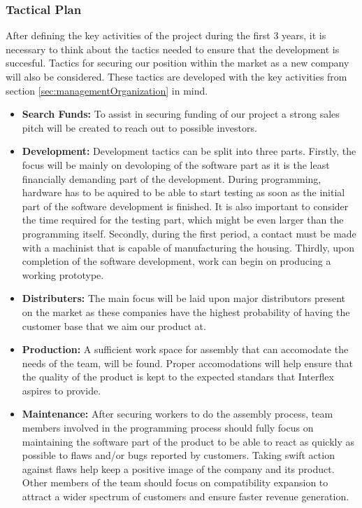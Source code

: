 \subsubsection{Tactical Plan}
After defining the key activities of the project during the first 3 years, it is necessary to think about the tactics needed to ensure that the development is succesful.
 Tactics for securing our position within the market as a new company will also be considered.
These tactics are developed with the key activities from section \ref{sec:managementOrganization} in mind.

\begin{itemize}
\item \textbf{Search Funds:} To assist in securing funding of our project a strong sales pitch will be created to reach out to possible investors.
\item \textbf{Development:} Development tactics can be split into three parts. 
Firstly, the focus will be mainly on devoloping of the software part as it is the least financially demanding part of the development. 
During programming, hardware has to be aquired to be able to start testing as soon as the initial part of the software development is finished. 
It is also important to consider the time required for the testing part, which might be even larger than the programming itself. 
Secondly, during the first period, a contact must be made with a machinist that is capable of manufacturing the housing.
Thirdly, upon completion of the software development, work can begin on producing a working prototype.
\item \textbf{Distributers:} The main focus will be laid upon major distributors present on the market as these companies have the highest probability of having the customer base that we aim our product at.
\item \textbf{Production:} A sufficient work space for assembly that can accomodate the needs of the team, will be found. Proper accomodations will help ensure that the quality of the product is kept to the expected standars that Interflex aspires to provide.
\item \textbf{Maintenance:} After securing workers to do the assembly process, team members involved in the programming process should fully focus on maintaining the software part of the product to be able to react as quickly as possible to flaws and/or bugs reported by customers. Taking swift action against flaws help keep a positive image of the company and its product. Other members of the team should focus on compatibility expansion to attract a wider spectrum of customers and ensure faster revenue generation.
\end{itemize}


